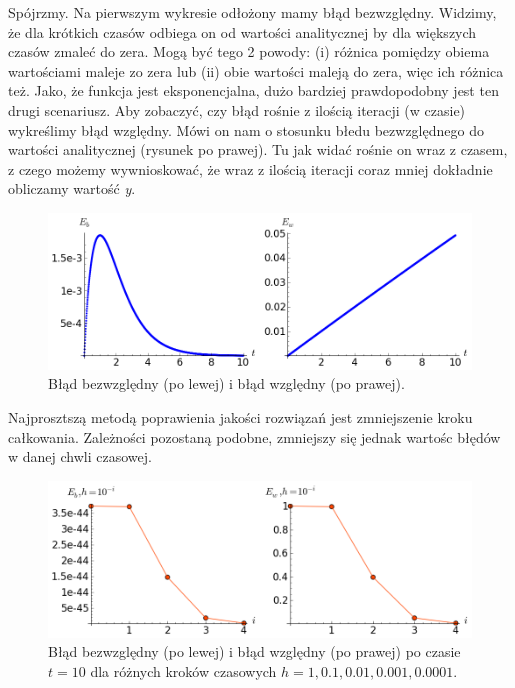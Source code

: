 \documentclass[a4paper,12pt,polish]{sphinxmanual}
\begin{document}
Spójrzmy. Na pierwszym wykresie odłożony mamy błąd bezwzględny. Widzimy, że dla krótkich czasów odbiega on od wartości
analitycznej by dla większych czasów zmaleć do zera. Mogą być tego 2 powody: (i) różnica pomiędzy obiema wartościami
maleje zo zera lub (ii) obie wartości maleją do zera, więc ich różnica też. Jako, że funkcja jest eksponencjalna,
dużo bardziej prawdopodobny jest ten drugi scenariusz. Aby zobaczyć, czy błąd rośnie z ilością iteracji
(w czasie) wykreślimy błąd względny. Mówi on nam o stosunku błedu bezwzględnego do wartości analitycznej (rysunek
po prawej). Tu jak widać rośnie on wraz z czasem, z czego możemy wywnioskować, że wraz z ilością iteracji
coraz mniej dokładnie obliczamy wartość \emph{y}.
\begin{figure}[htbp]
\centering
\capstart

\includegraphics{euler_err.png}
\caption{Błąd bezwzględny (po lewej) i błąd względny (po prawej).}\end{figure}

Najprosztszą metodą poprawienia jakości rozwiązań jest zmniejszenie kroku całkowania. Zależności pozostaną podobne,
zmniejszy się jednak wartośc błędów w danej chwli czasowej.
\begin{figure}[htbp]
\centering
\capstart

\includegraphics{euler_ebw_h.png}
\caption{Błąd bezwzględny (po lewej) i błąd względny (po prawej) po czasie $t=10$ dla różnych kroków czasowych
$h = 1, 0.1, 0.01, 0.001, 0.0001$.}\end{figure}
\end{document}
